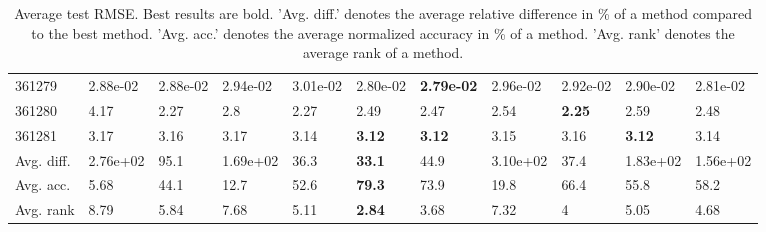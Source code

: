 \begin{table}[ht!]
\begin{tabular}{lllllllllll}
  361279 & 2.88e-02 & 2.88e-02 & 2.94e-02 & 3.01e-02 & 2.80e-02 & \textbf{2.79e-02} & 2.96e-02 & 2.92e-02 & 2.90e-02 & 2.81e-02 \\ 
  361280 & 4.17 & 2.27 & 2.8 & 2.27 & 2.49 & 2.47 & 2.54 & \textbf{2.25} & 2.59 & 2.48 \\ 
  361281 & 3.17 & 3.16 & 3.17 & 3.14 & \textbf{3.12} & \textbf{3.12} & 3.15 & 3.16 & \textbf{3.12} & 3.14 \\ 
   \hline
Avg. diff. & 2.76e+02 & 95.1 & 1.69e+02 & 36.3 & \textbf{33.1} & 44.9 & 3.10e+02 & 37.4 & 1.83e+02 & 1.56e+02 \\ 
  Avg. acc. & 5.68 & 44.1 & 12.7 & 52.6 & \textbf{79.3} & 73.9 & 19.8 & 66.4 & 55.8 & 58.2 \\ 
  Avg. rank & 8.79 & 5.84 & 7.68 & 5.11 & \textbf{2.84} & 3.68 & 7.32 & 4 & 5.05 & 4.68 \\ 
   \hline
\hline
\end{tabular}
\endgroup
\caption{Average test RMSE. 
                  Best results are bold. 
                  'Avg. diff.' denotes the average relative difference in \% of a method compared to the best method.
                  'Avg. acc.' denotes the average normalized accuracy in \% of a method.
                  'Avg. rank' denotes the average rank of a method.} 
\label{TABLES/table_results_RMSE_clustering}
\end{table}
